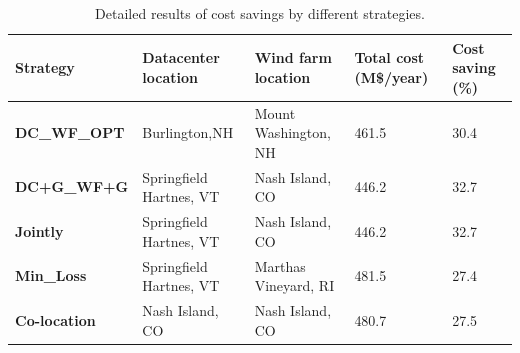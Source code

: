 \begin{table}[ht]
\begin{center}
\caption{Detailed results of cost savings by different strategies.}
\begin{tabular}{|l|p{50pt}|p{50pt}|p{30pt}|p{20pt}|}
\hline
\textbf{Strategy}& \textbf{Datacenter location} &\textbf{Wind farm location} &\textbf{Total cost (M\$/year)} &\textbf{Cost saving (\%)} \\
\hline
\textbf{DC\_WF\_OPT} &  Burlington,NH  & Mount Washington, NH & 461.5& 30.4 \\
\textbf{DC+G\_WF+G} &Springfield Hartnes, VT  & Nash Island, CO& 446.2& 32.7\\
\textbf{Jointly} &Springfield Hartnes, VT&  Nash Island, CO & 446.2 & 32.7\\
\textbf{Min\_Loss} &Springfield Hartnes, VT & Marthas Vineyard, RI & 481.5 & 27.4 \\
\textbf{Co-location}& Nash Island, CO &Nash Island, CO& 480.7 & 27.5  \\
\hline
\end{tabular}
\label{tab:costsaving}
\end{center}
\end{table}

